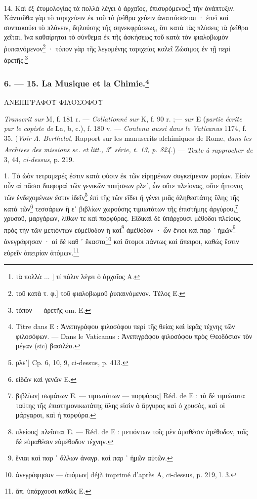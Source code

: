 \documentclass[a4paper, 11pt, oneside, polutonikogreek, french]{article}
\begin{document}
14. Καὶ ἐξ ἐτυμολογίας τὰ πολλὰ λέγει ὁ ἀρχαῖος, ἐπισυρόμενος\footnote{τὰ πολλὰ ... ] τί πάλιν λέγει ὁ ἀρχαῖος A.} τὴν ἀνάπτυξιν. Κἀνταῦθα γὰρ τὸ ταριχεύειν ἐκ τοῦ τὰ ῥεῖθρα χεύειν ἀναπτύσσεται · ἐπεὶ καὶ συνπακούει τὸ πλύνειν, δηλούσης τῆς σηνεκφράσεως, ὅτι κατὰ τὰς πλύσεις τὰ ῥεῖθρα χεῖται, ἵνα καθαίρηται τὸ σύνθεμα ἐκ τῆς ἀσκήσεως τοῦ κατὰ τὸν φιαλοβωμὸν ῥυπαινόμενον\footnote{τοῦ κατὰ τ. φ.] τοῦ φιαλοβωμοῦ ῥυπαινόμενον. Τέλος E.} · τόπον γὰρ τῆς λεγομένης ταριχείας καλεῖ Ζώσιμος ἐν τῇ περὶ ἀρετῆς.\footnote{τόπον --- ἀρετῆς om. E.}

\bigskip
\centerline{\EightStarTaper}
\centerline{\EightStarTaper\EightStarTaper}
\bigskip

\subsubsection[6. --- 15. La Musique et la Chimie.]{6. --- 15. La Musique et la Chimie.\footnote{Titre dans E : Ἀνεπιγράφου φιλοσόφου περὶ τῆς θείας καὶ ἱερᾶς τέχνης τῶν φιλοσόφων. --- Dans le Vaticanus : Ἀνεπιγράφου φιλοσόφου πρὸς Θεοδόσιον τὸν μέγαν (sic) βασιλέα.}}

ΑΝΕΠΙΓΡΑΦΟΥ ΦΙΛΟΣΟΦΟΥ

\emph{Transcrit sur} M, f. 181 r. --- \emph{Collationné sur} K, f. 90 r. ;--- \emph{sur} E (\emph{partie écrite par le copiste de} La, b, c.), f. 180 v. --- \emph{Contenu aussi dans le Vaticanus} 1174, f. 35. (\emph{Voir A. Berthelot}, Rapport sur les manuscrits alchimiques de Rome, \emph{dans les Archiνes des missions sc. et litt., 3\textsuperscript{e} série, t. 13, p. 824.}) --- \emph{Texte à rapprocher de} 3, 44, \emph{ci-dessus}, p. 219.

\bigskip

1. Τὸ ὠὸν τετραμερές ἐστιν κατὰ φύσιν ἐκ τῶν εἰρημένων συγκείμενον μορίων. Εἰσὶν οὖν αἱ πᾶσαι διαφοραὶ τῶν γενικῶν ποιήσεων ρλεʹ, ὧν οὔτε πλείονας, οὔτε ἥττονας τῶν ἐνδεχομένων ἔστιν ἰδεῖν\footnote{ρλεʹ] Cp. 6, 10, 9, ci-dessus, p. 413.} ἐπὶ τῆς τῶν εἴδει ἢ γένει μιᾶς ἀληθεστάτης ὕλης τῆς κατὰ τῶν\footnote{εἰδῶν καὶ γενῶν E.} τεσσάρων ἢ εʹ βιβλίων χωρούσης τιμιωτάτων τῆς ἐπιστήμης ἀργύρου,\footnote{βιβλίων] σωμάτων E. --- τιμιωτάτων --- πορφύρας] Réd. de E : τὰ δὲ τιμιώτατα ταύτης τῆς ἐπιστημονικωτάτης ὕλης εἰσὶν ὁ ἄργυρος καὶ ὁ χρυσὸς, καὶ οἱ μάργαροι, καὶ ἡ πορφύρα.} χρυσοῦ, μαργάρων, λίθων τε καὶ πορφύρας. Εἰδικαὶ δὲ ὑπάρχουσι μέθοδοι πλείους, πρὸς τὴν τῶν μετιόντων εὐμέθοδον ἢ καὶ\footnote{πλείους] πλεῖσται E. --- Réd. de E : μετιόντων τοῖς μὲν ἀμαθέσιν ἀμέθοδον, τοῖς δὲ εὐμαθέσιν εὐμέθοδον τέχνην.} ἀμέθοδον · ὧν ἔνιοι καὶ παρ ᾽ ἡμῶν\footnote{ἔνιαι καὶ παρ ᾽ ἄλλων ἀναγρ. καὶ παρ ᾽ ἡμῶν αὐτῶν.} ἀνεγράφησαν · αἱ δὲ καθ ᾽ ἕκαστα\footnote{ἀνεγράφησαν --- ἀτόμων] déjà imprimé d'après A, ci-dessus, p. 219, l. 3.} καὶ ἄτομοι πάντως καὶ ἄπειροι, καθὼς ἔστιν εὑρεῖν ἀπειρίαν ἀτόμων.\footnote{ἄπ. ὑπάρχουσι καθὼς E.}
\end{document}
